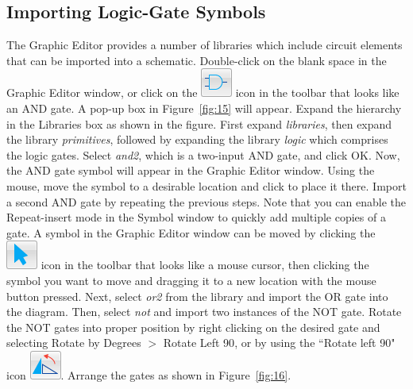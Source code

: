 \documentclass[11pt, twoside, pdftex]{article}
\begin{document}
\subsection{Importing Logic-Gate Symbols}
The Graphic Editor provides a number of libraries which include circuit elements
that can be imported into a schematic. 
Double-click on the blank space in the Graphic Editor window,
or click on the \includegraphics[scale=0.45]{figures/icon1.png} icon in the toolbar
that looks like an AND gate.
A pop-up box in Figure~\ref{fig:15} will appear. Expand the hierarchy 
in the Libraries box as shown in the figure. First expand {\it libraries}, then
expand the library {\it primitives}, followed by expanding the library {\it logic} 
which comprises the logic gates.
Select {\it and2}, which is a two-input AND gate, and click {\sf OK}.
Now, the AND gate symbol will appear in the Graphic Editor window.
Using the mouse, move the symbol to a desirable location and click to place it there.
Import a second AND gate by repeating the previous steps. Note that you
can enable the {\sf Repeat-insert mode} in the {\sf Symbol} window
to quickly add multiple copies of a gate.
A symbol in the Graphic Editor window can be moved by clicking the
\includegraphics[scale=0.45]{figures/icon4.png} icon in the toolbar
that looks like a mouse cursor, then clicking the symbol you want to move
and dragging it to a new location with the mouse button pressed.
Next, select {\it or2} from the library and import the OR gate into the diagram.
Then, select {\it not} and import two instances of the NOT gate. 
Rotate the NOT gates into proper position by right clicking on the desired gate
and selecting {\sf Rotate by Degrees $>$ Rotate Left 90}, or by using the 
``Rotate left 90" icon \includegraphics[scale=0.45]{figures/icon2.png}.
Arrange the gates as shown in Figure~\ref{fig:16}.
 
\end{document}
